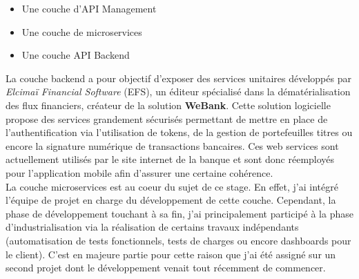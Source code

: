 \begin{itemize}
	\item Une couche d'API Management
	\item Une couche de microservices
	\item Une couche API Backend \\
\end{itemize} 

	La couche backend a pour objectif d'exposer des services unitaires développés par \textit{Elcimaï Financial Software} (EFS), un éditeur spécialisé dans la dématérialisation des flux financiers, créateur de la solution \textbf{WeBank}. Cette solution logicielle propose des services grandement sécurisés permettant de mettre en place de l'authentification via l'utilisation de tokens, de la gestion de portefeuilles titres ou encore la signature numérique de transactions bancaires. Ces web services sont actuellement utilisés par le site internet de la banque et sont donc réemployés pour l'application mobile afin d'assurer une certaine cohérence. \\

	La couche microservices est au coeur du sujet de ce stage. En effet, j'ai intégré l'équipe de projet en charge du développement de cette couche. Cependant, la phase de développement touchant à sa fin, j'ai principalement participé à la phase d'industrialisation via la réalisation de certains travaux indépendants (automatisation de tests fonctionnels, tests de charges ou encore dashboards pour le client). C'est en majeure partie pour cette raison que j'ai été assigné sur un second projet dont le développement venait tout récemment de commencer.